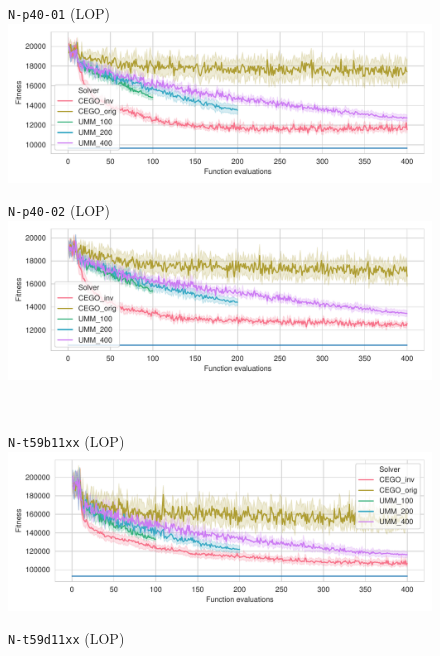 \documentclass[sigconf,dvipsnames]{acmart}
\begin{document}
\begin{figure}[tb]
\small
\centering%
\begin{minipage}{0.49\linewidth}
  \texttt{N-p40-01} (LOP)\\[-0.5ex]
  \includegraphics[width=\textwidth]{../img/fitness_lop_RandB_N-p40-01}
\end{minipage}
\begin{minipage}{0.49\linewidth}
  \texttt{N-p40-02} (LOP)\\[-0.5ex]
  \includegraphics[width=\textwidth]{../img/fitness_lop_RandB_N-p40-02}
\end{minipage}
\\
\begin{minipage}{0.49\linewidth}
  \texttt{N-t59b11xx} (LOP)\\[-0.5ex]
  \includegraphics[width=\textwidth]{../img/fitness_lop_IO_N-t59b11xx}
\end{minipage}
\begin{minipage}{0.49\linewidth}
  \texttt{N-t59d11xx} (LOP)\\[-0.5ex]

\end{minipage}
\end{figure}
\end{document}
